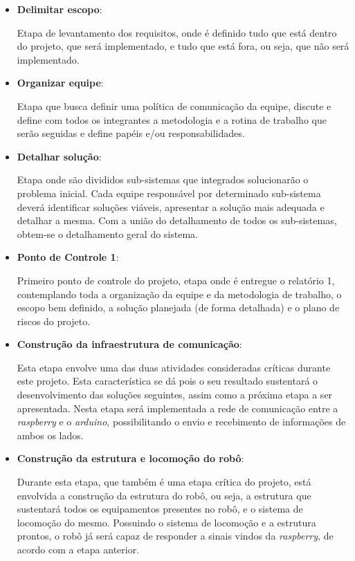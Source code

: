 	\begin{itemize}
		\item \textbf{Delimitar escopo}:

			Etapa de levantamento dos requisitos, onde é definido tudo que está dentro do projeto, que será implementado, e tudo que está fora, ou seja, que não será implementado.

		\item \textbf{Organizar equipe}:

			Etapa que busca definir uma política de comunicação da equipe, discute e define com todos os integrantes a metodologia e a rotina de trabalho que serão seguidas e define papéis e/ou responsabilidades.

		\item \textbf{Detalhar solução}:

			Etapa onde são divididos sub-sistemas que integrados solucionarão o problema inicial. Cada equipe responsável por determinado sub-sistema deverá identificar soluções viáveis, apresentar a solução mais adequada e detalhar a mesma. Com a união do detalhamento de todos os sub-sistemas, obtem-se o detalhamento geral do sistema.

		\item \textbf{Ponto de Controle 1}:

			Primeiro ponto de controle do projeto, etapa onde é entregue o relatório 1, contemplando toda a organização da equipe e da metodologia de trabalho, o escopo bem definido, a solução planejada (de forma detalhada) e o plano de riscos do projeto.

		\item \textbf{Construção da infraestrutura de comunicação}:

			Esta etapa envolve uma das duas atividades consideradas críticas durante este projeto. Esta característica se dá pois o seu resultado sustentará o desenvolvimento das soluções seguintes, assim como a próxima etapa a ser apresentada. Nesta etapa será implementada a rede de comunicação entre a \textit{raspberry} e o \textit{arduino}, possibilitando o envio e recebimento de informações de ambos os lados.

		\item \textbf{Construção da estrutura e locomoção do robô}:

			Durante esta etapa, que também é uma etapa crítica do projeto, está envolvida a construção da estrutura do robô, ou seja, a estrutura que sustentará todos os equipamentos presentes no robô, e o sistema de locomoção do mesmo. Possuindo o sistema de locomoção e a estrutura prontos, o robô já será capaz de responder a sinais vindos da \textit{raspberry}, de acordo com a etapa anterior.


\end{itemize}

